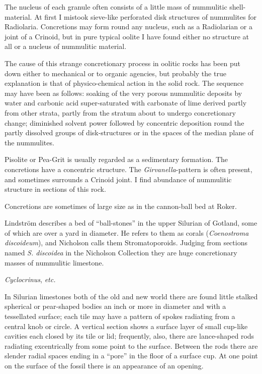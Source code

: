 \documentclass[a4paper, 12pt, oneside]{article}
\begin{document}
The nucleus of each granule often consists of a little mass of nummulitic shell-material. At first I mistook sieve-like perforated disk structures of nummulites for Radiolaria. Concretions may form round any nucleus, such as a Radiolarian or a joint of a Crinoid, but in pure typical oolite I have found either no structure at all or a nucleus of nummulitic material.

The cause of this strange concretionary process in oolitic rocks has been put down either to mechanical or to organic agencies, but probably the true explanation is that of physico-chemical action in the solid rock. The sequence may have been as follows: soaking of the very porous nummulitic deposits by water and carbonic acid super-saturated with carbonate of lime derived partly from other strata, partly from the stratum about to undergo concretionary change; diminished solvent power followed by concentric deposition round the partly dissolved groups of disk-structures or in the spaces of the median plane of the nummulites.

Pisolite or Pea-Grit is usually regarded as a sedimentary formation. The concretions have a concentric structure. The \emph{Girvanella}-pattern is often present, and sometimes surrounds a Crinoid joint. I find abundance of nummulitic structure in sections of this rock.

Concretions are sometimes of large size as in the cannon-ball bed at Roker.

Lindström describes a bed of ``ball-stones'' in the upper Silurian of Gotland, some of which are over a yard in diameter. He refers to them as corals (\emph{Coenostroma discoideum}), and Nicholson calls them Stromatoporoids. Judging from sections named \emph{S. discoidea} in the Nicholson Collection they are huge concretionary masses of nummulitic limestone.

\emph{Cyclocrinus}, \emph{etc.}

In Silurian limestones both of the old and new world there are found little stalked spherical or pear-shaped bodies an inch or more in diameter and with a tessellated surface; each tile may have a pattern of spokes radiating from a central knob or circle. A vertical section shows a surface layer of small cup-like cavities each closed by its tile or lid; frequently, also, there are lance-shaped rods radiating excentrically from some point to the surface. Between the rods there are slender radial spaces ending in a ``pore'' in the floor of a surface cup. At one point on the surface of the fossil there is an appearance of an opening.
\end{document}
